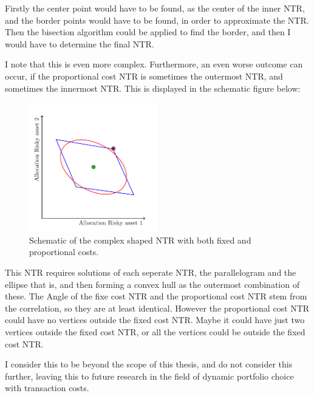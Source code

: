 \documentclass[11pt]{article}
\begin{document}
Firstly the center point would have to be found, as the center of the inner NTR, and the border points would have to be found, in order to approximate the NTR.
Then the bisection algorithm could be applied to find the border, and then I would have to determine the final NTR.

I note that this is even more complex.
Furthermore, an even worse outcome can occur, if the proportional cost NTR is sometimes the outermost NTR, and sometimes the innermost NTR.
This is displayed in the schematic figure below:
\begin{figure}[!ht]
    \centering
    \includegraphics[width=0.5\textwidth]{../Sections/Tikz Final Figure.pdf}
    \caption{Schematic of the complex shaped NTR with both fixed and proportional costs.}
    \label{fig: Tikz_Final_TR}
\end{figure}
\FloatBarrier
This NTR requires solutions of each seperate NTR, the parallelogram and the ellipse that is, and then forming a convex hull as the outermost combination of these. 
The Angle of the fixe cost NTR and the proportional cost NTR stem from the correlation, so they are at least identical. However the proportional cost NTR could have no vertices outside the fixed cost NTR.
Maybe it could have just two vertices outside the fixed cost NTR, or all the vertices could be outside the fixed cost NTR.

I consider this to be beyond the scope of this thesis, and do not consider this further, leaving this to future research in the field of dynamic portfolio choice with transaction costs. 

\ifdefined\COMPILINGMAIN
\else
\end{document}
